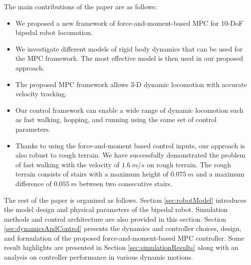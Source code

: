 	
The main contributions of the paper are as follows:
\begin{itemize}
    \item We proposed a new framework of force-and-moment-based MPC for 10-DoF bipedal robot locomotion.
    
    \item We investigate different models of rigid body dynamics that can be used for the MPC framework. The most effective model is then used in our proposed approach.
    
    \item The proposed MPC framework allows 3-D dynamic locomotion with accurate velocity tracking.
    \item Our control framework can enable a wide range of dynamic locomotion such as fast walking, hopping, and running using the same set of control parameters. 
    \item Thanks to using the force-and-moment based control inputs, our approach is also robust to rough terrain. We have successfully demonstrated the problem of fast walking with the velocity of $1.6\:\unit{m/s}$ on rough terrain. The rough terrain consists of stairs with a maximum height of $0.075\:\unit{m}$ and a maximum difference of $0.055\:\unit{m}$ between two consecutive stairs.
\end{itemize}

The rest of the paper is organized as follows. Section \ref{sec:robotModel} introduces the model design and physical parameters of the bipedal robot. Simulation methods and control architecture are also provided in this section. Section \ref{sec:dynamicsAndControl} presents the dynamics and controller choices, design, and formulation of the proposed force-and-moment-based MPC controller. Some result highlights are presented in Section \ref{sec:simulationResults} along with an analysis on controller performance in various dynamic motions. 
